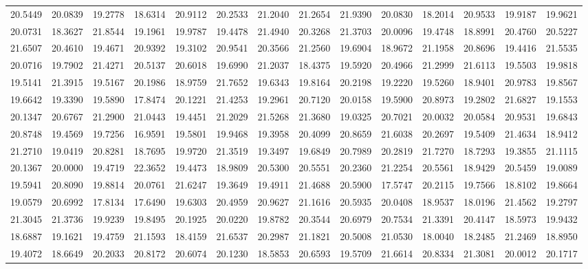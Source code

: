\documentclass[12pt]{article}\usepackage[]{graphicx}\usepackage[]{color}
\begin{document}
\begin{landscape}
\begin{longtable}[t]{rrrrrrrrrrrrrr}
20.5449 & 20.0839 & 19.2778 & 18.6314 & 20.9112 & 20.2533 & 21.2040 & 21.2654 & 21.9390 & 20.0830 & 18.2014 & 20.9533 & 19.9187 & 19.9621\\
20.0731 & 18.3627 & 21.8544 & 19.1961 & 19.9787 & 19.4478 & 21.4940 & 20.3268 & 21.3703 & 20.0096 & 19.4748 & 18.8991 & 20.4760 & 20.5227\\
21.6507 & 20.4610 & 19.4671 & 20.9392 & 19.3102 & 20.9541 & 20.3566 & 21.2560 & 19.6904 & 18.9672 & 21.1958 & 20.8696 & 19.4416 & 21.5535\\
20.0716 & 19.7902 & 21.4271 & 20.5137 & 20.6018 & 19.6990 & 21.2037 & 18.4375 & 19.5920 & 20.4966 & 21.2999 & 21.6113 & 19.5503 & 19.9818\\
19.5141 & 21.3915 & 19.5167 & 20.1986 & 18.9759 & 21.7652 & 19.6343 & 19.8164 & 20.2198 & 19.2220 & 19.5260 & 18.9401 & 20.9783 & 19.8567\\
19.6642 & 19.3390 & 19.5890 & 17.8474 & 20.1221 & 21.4253 & 19.2961 & 20.7120 & 20.0158 & 19.5900 & 20.8973 & 19.2802 & 21.6827 & 19.1553\\
20.1347 & 20.6767 & 21.2900 & 21.0443 & 19.4451 & 21.2029 & 21.5268 & 21.3680 & 19.0325 & 20.7021 & 20.0032 & 20.0584 & 20.9531 & 19.6843\\
20.8748 & 19.4569 & 19.7256 & 16.9591 & 19.5801 & 19.9468 & 19.3958 & 20.4099 & 20.8659 & 21.6038 & 20.2697 & 19.5409 & 21.4634 & 18.9412\\
21.2710 & 19.0419 & 20.8281 & 18.7695 & 19.9720 & 21.3519 & 19.3497 & 19.6849 & 20.7989 & 20.2819 & 21.7270 & 18.7293 & 19.3855 & 21.1115\\
20.1367 & 20.0000 & 19.4719 & 22.3652 & 19.4473 & 18.9809 & 20.5300 & 20.5551 & 20.2360 & 21.2254 & 20.5561 & 18.9429 & 20.5459 & 19.0089\\
19.5941 & 20.8090 & 19.8814 & 20.0761 & 21.6247 & 19.3649 & 19.4911 & 21.4688 & 20.5900 & 17.5747 & 20.2115 & 19.7566 & 18.8102 & 19.8664\\
19.0579 & 20.6992 & 17.8134 & 17.6490 & 19.6303 & 20.4959 & 20.9627 & 21.1616 & 20.5935 & 20.0408 & 18.9537 & 18.0196 & 21.4562 & 19.2797\\
21.3045 & 21.3736 & 19.9239 & 19.8495 & 20.1925 & 20.0220 & 19.8782 & 20.3544 & 20.6979 & 20.7534 & 21.3391 & 20.4147 & 18.5973 & 19.9432\\
18.6887 & 19.1621 & 19.4759 & 21.1593 & 18.4159 & 21.6537 & 20.2987 & 21.1821 & 20.5008 & 21.0530 & 18.0040 & 18.2485 & 21.2469 & 18.8950\\
19.4072 & 18.6649 & 20.2033 & 20.8172 & 20.6074 & 20.1230 & 18.5853 & 20.6593 & 19.5709 & 21.6614 & 20.8334 & 21.3081 & 20.0012 & 20.1717\\

\end{longtable}
\end{landscape}
\end{document}

